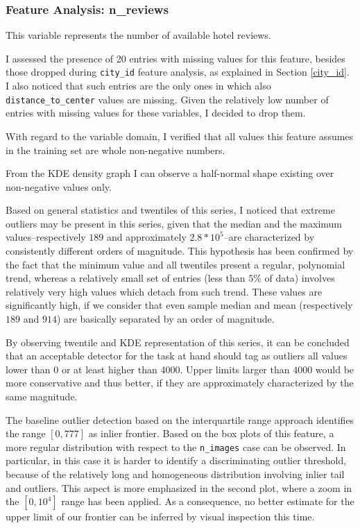 \documentclass[preprint,12pt,3p]{elsarticle}
\begin{document}
\subsubsection{Feature Analysis: n\_reviews}
This variable represents the number of available hotel reviews.

I assessed the presence of 20 entries with missing values for this feature, besides those dropped during \verb|city_id| feature analysis, as explained in Section \ref{city_id}. I also noticed that such entries are the only ones in which also \verb|distance_to_center| values are missing. Given the relatively low number of entries with missing values for these variables, I decided to drop them.

With regard to the variable domain, I verified that all values this feature assumes in the training set are whole non-negative numbers.

From the KDE density graph I can observe a half-normal shape existing over non-negative values only.

Based on general statistics and twentiles of this series, I noticed that extreme outliers may be present in this series, given that the median and the maximum values--respectively $189$ and approximately $2.8*10^5$--are characterized by consistently different orders of magnitude. This hypothesis has been confirmed by the fact that the minimum value and all twentiles present a regular, polynomial trend, whereas a relatively small set of entries (less than $5\%$ of data) involves relatively very high values which detach from such trend. These values are significantly high, if we consider that even sample median and mean (respectively $189$ and $914$) are basically separated by an order of magnitude.

By observing twentile and KDE representation of this series, it can be concluded that an acceptable detector for the task at hand should tag as outliers all values lower than $0$ or at least higher than $4000$. Upper limits larger than $4000$ would be more conservative and thus better, if they are approximately characterized by the same magnitude.

The baseline outlier detection based on the interquartile range approach identifies the range $[0,777]$ as inlier frontier.
Based on the box plots of this feature, a more regular distribution with respect to the \verb|n_images| case can be observed. In particular, in this case it is harder to identify a discriminating outlier threshold, because of the relatively long and homogeneous distribution involving inlier tail and outliers. This aspect is more emphasized in the second plot, where a zoom in the $[0,10^4]$ range has been applied. As a consequence, no better estimate for the upper limit of our frontier can be inferred by visual inspection this time.
\end{document}
